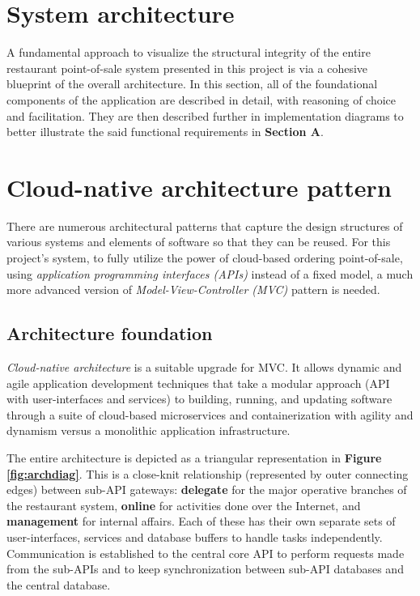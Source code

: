 \documentclass[12pt, a4paper]{article}
\theoremstyle{styleth}
\theoremstyle{styledef}
\begin{document}
\newpage
\section*{System architecture}
%
	
A fundamental approach to visualize the structural integrity of the entire restaurant point-of-sale system presented in this project is via a cohesive blueprint of the overall architecture. In this section, all of the foundational components of the application are described in detail, with reasoning of choice and facilitation. They are then described further in implementation diagrams to better illustrate the said functional requirements in \textbf{Section A}. 

\setcounter{section}{0}
\section{Cloud-native architecture pattern} 

There are numerous architectural patterns that capture the design structures of various systems and elements of software so that they can be reused. For this project's system, to fully utilize the power of cloud-based ordering point-of-sale, using \textit{application programming interfaces (APIs)} instead of a fixed model, a much more advanced version of \textit{Model-View-Controller (MVC)} pattern is needed.

\subsection{Architecture foundation}

\textit{Cloud-native architecture} is a suitable upgrade for MVC. It allows dynamic and agile application development techniques that take a modular approach (API with user-interfaces and services) to building, running, and updating software through a suite of cloud-based microservices and containerization with agility and dynamism versus a monolithic application infrastructure.

\vspace{5mm}
The entire architecture is depicted as a triangular representation in \textbf{Figure \ref{fig:archdiag}}. This is a close-knit relationship (represented by outer connecting edges) between sub-API gateways: \textbf{delegate} for the major operative branches of the restaurant system, \textbf{online} for activities done over the Internet, and \textbf{management} for internal affairs. Each of these has their own separate sets of user-interfaces, services and database buffers to handle tasks independently. Communication is established to the central core API to perform requests made from the sub-APIs and to keep synchronization between sub-API databases and the central database.
\end{document}
